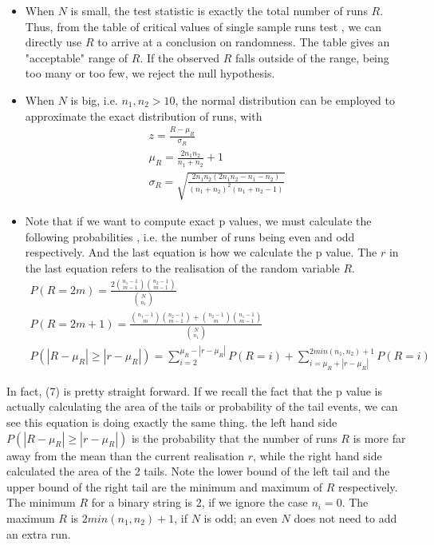 \documentclass[12pt]{article}
\theoremstyle{plain}
\theoremstyle{definition}
\theoremstyle{remark}
\begin{document}
\begin{itemize}
    \item When $N$ is small, the test statistic is exactly the total number of runs $R$. Thus, from the table of critical values of single sample runs test \cite[Table~A8]{3.4}, we can directly use $R$ to arrive at a conclusion on randomness. The table gives an "acceptable" range of $R$. If the observed $R$ falls outside of the range, being too many or too few, we reject the null hypothesis.
    \item When $N$ is big, i.e. $n_1,n_2>10$, the normal distribution can be employed to approximate the exact
    distribution of runs\cite{3.4}\cite{3.1}\cite{3.3}, with
    \begin{gather*}
      z=\frac{R-\mu_R}{\sigma_R}\\
      \mu_R=\frac{2n_1n_2}{n_1+n_2}+1\\
      \sigma_R=\sqrt{\frac{2n_1n_2(2n_1n_2-n_1-n_2)}{(n_1+n_2)^2(n_1+n_2-1)}}
    \end{gather*}
    \item Note that if we want to compute exact p values, we must calculate the following probabilities \cite{3.3}\cite{3.6}, i.e. the number of runs being even and odd respectively. And the last equation is how we calculate the p value. The $r$ in the last equation refers to the realisation of the random variable $R$.
    \begin{gather}
      P(R=2m)=\frac{2\binom{n_1-1}{m-1}\binom{n_2-1}{m-1}}{\binom{N}{n_1}}\\
      P(R=2m+1)=\frac{\binom{n_1-1
      }{m}\binom{n_2-1}{m-1}+\binom{n_2-1}{m} \binom{n_1-1}{m-1}}{\binom{N}{n_1}}\\
      P(|R-\mu_R|\ge|r-\mu_R|)=\sum_{i=2}^{\mu_R-|r-\mu_R|}P(R=i)+\sum_{i=\mu_R+|r-\mu_R|}^{2min(n_1,n_2)+1}P(R=i)
    \end{gather}
\end{itemize}

In fact, (7) is pretty straight forward. If we recall the fact that the p value is actually calculating the area of the tails or probability of the tail events, we can see this equation is doing exactly the same thing. the left hand side $P(|R-\mu_R|\ge|r-\mu_R|)$ is the probability that the number of runs $R$ is more far away from the mean than the current realisation $r$, while the right hand side calculated the area of the 2 tails. Note the lower bound of the left tail and the upper bound of the right tail are the minimum and maximum of $R$ respectively. The minimum $R$ for a binary string is 2, if we ignore the case $n_i=0$. The maximum $R$ is $2min(n_1,n_2)+1$, if $N$ is odd; an even $N$ does not need to add an extra run. 
\end{document}
